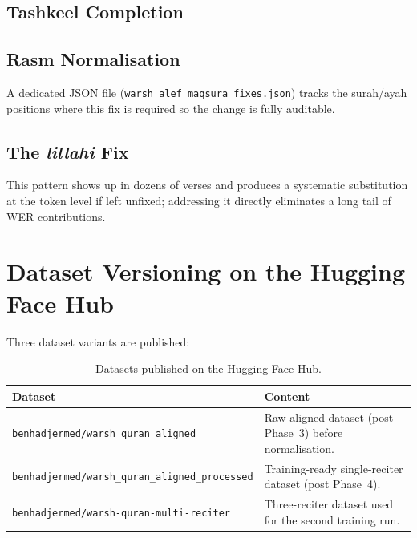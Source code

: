 \subsection{Tashkeel Completion}

\subsection{Rasm Normalisation}

A dedicated JSON file (\texttt{warsh\_alef\_maqsura\_fixes.json}) tracks
the surah/ayah positions where this fix is required so the change is
fully auditable.

\subsection{The \textit{lillahi} Fix}

This pattern shows up in dozens of verses and produces a systematic
substitution at the token level if left unfixed; addressing it directly
eliminates a long tail of WER contributions.

\section{Dataset Versioning on the Hugging Face Hub}


Three dataset variants are published:

\begin{table}[H]
  \centering
  \caption{Datasets published on the Hugging Face Hub.}
  \label{tab:mt_published_datasets}
  \renewcommand{\arraystretch}{1.3}
  \begin{tabular}{lp{8.5cm}}
    \toprule
    \textbf{Dataset} & \textbf{Content} \\
    \midrule
    \texttt{benhadjermed/warsh\_quran\_aligned} & Raw aligned dataset (post Phase~3) before normalisation. \\
    \texttt{benhadjermed/warsh\_quran\_aligned\_processed} & Training-ready single-reciter dataset (post Phase~4). \\
    \texttt{benhadjermed/warsh-quran-multi-reciter} & Three-reciter dataset used for the second training run. \\
    \bottomrule
  \end{tabular}
\end{table}

